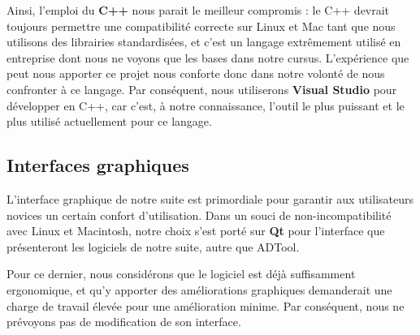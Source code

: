         Ainsi, l'emploi du {\bf C++} nous parait le meilleur compromis : le C++ devrait toujours permettre une compatibilité correcte sur Linux et Mac tant que nous utilisons des librairies standardisées, et c'est un langage extrêmement utilisé en entreprise dont nous ne voyons que les bases dans notre cursus. L'expérience que peut nous apporter ce projet nous conforte donc dans notre volonté de nous confronter à ce langage. Par conséquent, nous utiliserons {\bf Visual Studio} pour développer en C++, car c'est, à notre connaissance, l'outil le plus puissant et le plus utilisé actuellement pour ce langage.

    \subsection{Interfaces graphiques}
        L'interface graphique de notre suite est primordiale pour garantir aux utilisateurs novices un certain confort d'utilisation. Dans un souci de non-incompatibilité avec Linux et Macintosh, notre choix s'est porté sur {\bf Qt} pour l'interface que présenteront les logiciels de notre suite, autre que ADTool. 
        
        Pour ce dernier, nous considérons que le logiciel est déjà suffisamment ergonomique, et qu'y apporter des améliorations graphiques demanderait une charge de travail élevée pour une amélioration minime. Par conséquent, nous ne prévoyons pas de modification de son interface.